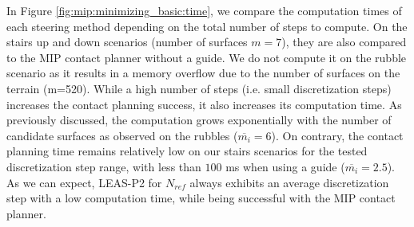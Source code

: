 In Figure \ref{fig:mip:minimizing_basic:time}, we compare the computation times of each steering method depending on the total number of steps to compute. On the stairs up and down scenarios (number of surfaces $m=7$), they are also compared to the MIP contact planner without a guide. We do not compute it on the rubble scenario as it results in a memory overflow due to the number of surfaces on the terrain (m=520).
While a high number of steps (i.e. small discretization steps) increases the contact planning success, it also increases its computation time. As previously discussed, the computation grows exponentially with the number of candidate surfaces as observed on the rubbles ($\overline{m_i}=6$).
On contrary, the contact planning time remains relatively low on our stairs scenarios for the tested discretization step range, with less than $100$ ms when using a guide ($\overline{m_i}=2.5$).
As we can expect, LEAS-P2 for $N_{ref}$ always exhibits an average discretization step with a low computation time, while being successful with the MIP contact planner.


